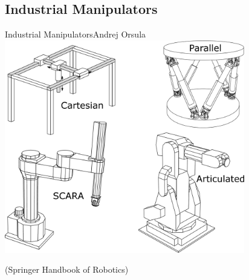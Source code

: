 \subsection{Industrial Manipulators}
\begin{frame}{Industrial Manipulators}{Andrej Orsula}
\centering
\includegraphics[width=0.785\textwidth]{graphics/andrej/indu_mani}

\tiny{(Springer Handbook of Robotics)}

\end{frame}

